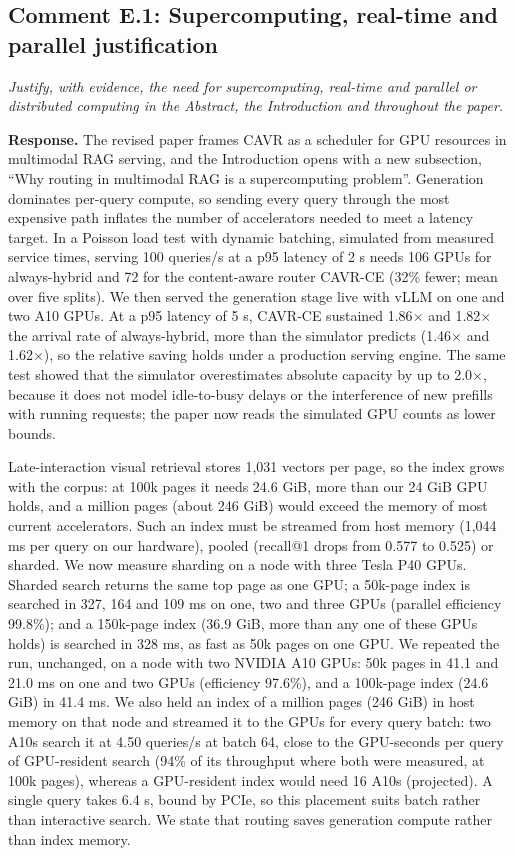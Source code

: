 \documentclass[11pt]{article}
\newcommand{\reviewer}[1]{{\color{blue!55!black}\itshape #1\par}}
\begin{document}
\subsection*{Comment E.1: Supercomputing, real-time and parallel justification}
\reviewer{Justify, with evidence, the need for supercomputing, real-time and parallel or distributed computing in the Abstract, the Introduction and throughout the paper.}
\textbf{Response.} The revised paper frames CAVR as a scheduler for GPU resources in multimodal RAG serving, and the Introduction opens with a new subsection, ``Why routing in multimodal RAG is a supercomputing problem''. Generation dominates per-query compute, so sending every query through the most expensive path inflates the number of accelerators needed to meet a latency target. In a Poisson load test with dynamic batching, simulated from measured service times, serving 100 queries/s at a p95 latency of 2 s needs 106 GPUs for always-hybrid and 72 for the content-aware router CAVR-CE (32\% fewer; mean over five splits). We then served the generation stage live with vLLM on one and two A10 GPUs. At a p95 latency of 5 s, CAVR-CE sustained 1.86$\times$ and 1.82$\times$ the arrival rate of always-hybrid, more than the simulator predicts (1.46$\times$ and 1.62$\times$), so the relative saving holds under a production serving engine. The same test showed that the simulator overestimates absolute capacity by up to 2.0$\times$, because it does not model idle-to-busy delays or the interference of new prefills with running requests; the paper now reads the simulated GPU counts as lower bounds.

Late-interaction visual retrieval stores 1,031 vectors per page, so the index grows with the corpus: at 100k pages it needs 24.6 GiB, more than our 24 GiB GPU holds, and a million pages (about 246 GiB) would exceed the memory of most current accelerators. Such an index must be streamed from host memory (1,044 ms per query on our hardware), pooled (recall@1 drops from 0.577 to 0.525) or sharded. We now measure sharding on a node with three Tesla P40 GPUs. Sharded search returns the same top page as one GPU; a 50k-page index is searched in 327, 164 and 109 ms on one, two and three GPUs (parallel efficiency 99.8\%); and a 150k-page index (36.9 GiB, more than any one of these GPUs holds) is searched in 328 ms, as fast as 50k pages on one GPU. We repeated the run, unchanged, on a node with two NVIDIA A10 GPUs: 50k pages in 41.1 and 21.0 ms on one and two GPUs (efficiency 97.6\%), and a 100k-page index (24.6 GiB) in 41.4 ms. We also held an index of a million pages (246 GiB) in host memory on that node and streamed it to the GPUs for every query batch: two A10s search it at 4.50 queries/s at batch 64, close to the GPU-seconds per query of GPU-resident search (94\% of its throughput where both were measured, at 100k pages), whereas a GPU-resident index would need 16 A10s (projected). A single query takes 6.4 s, bound by PCIe, so this placement suits batch rather than interactive search. We state that routing saves generation compute rather than index memory.
\end{document}
